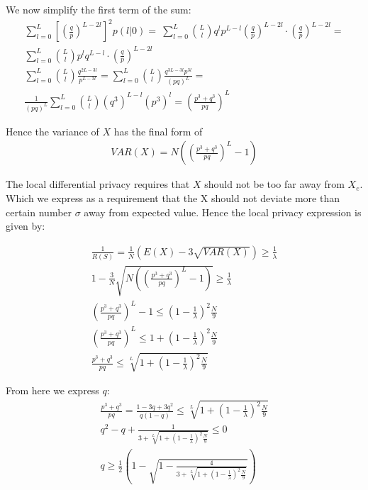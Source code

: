 \documentclass[11pt,draft]{article}
\begin{document}
We now simplify the first term of the sum:
\begin{align}
 \sum_{l=0}^{L} \left [  \left ( \frac{q}{p} \right )^ {L - 2l} \right ]^2 p(l|0)  = \
 \sum_{l=0}^{L} \binom{L}{l} q^lp^{L-l} \left ( \frac{q}{p} \right )^ {L - 2l} \cdot  \left ( \frac{q}{p} \right )^ {L - 2l} = \\
 \sum_{l=0}^{L} \binom{L}{l} p^lq^{L-l} \cdot  \left ( \frac{q}{p} \right )^ {L - 2l}  \\
 \sum_{l=0}^{L}  \binom{L}{l}   \frac{q^{2L-3l}}{p^{L-3l}} = \sum_{l=0}^{L}  \binom{L}{l}   \frac{q^{3L-3l} p^{3l}}{(pq)^{L}} = \\
 \frac{1}{(pq)^{L}} \sum_{l=0}^{L}  \binom{L}{l}   (q^3)^{L-l} (p^3)^{l} = \left ( \frac{p^3 + q^3}{pq} \right )^L
\end{align}

Hence the variance of $X$ has the final form of
\begin{align}
VAR(X) = N   \left (  \left ( \frac{p^3 + q^3}{pq} \right )^L - 1 \right )
\end{align}

The local differential privacy requires that $X$ should not be too far away from $X_e$.  Which we express as a requirement that the X should not deviate more than certain number $\sigma$ away from expected value.  Hence the local privacy expression is given by:

\begin{align}
\frac{1}{R(S)} =   \frac{1}{N}   (E(X) - 3\sqrt{VAR(X)}) \ge \frac{1}{\lambda}  \\
1 - \frac{3}{N} \sqrt{N   \left (  \left ( \frac{p^3 + q^3}{pq} \right )^L - 1 \right )}  \ge \frac{1}{\lambda}  \\
\left ( \frac{p^3 + q^3}{pq} \right )^L - 1 \le (1 -  \frac{1}{\lambda})^2 \frac{N}{9} \\
\left ( \frac{p^3 + q^3}{pq} \right )^L  \le 1 + (1 -  \frac{1}{\lambda})^2 \frac{N}{9} \\
 \frac{p^3 + q^3}{pq} \le \sqrt[L]{1 + (1 -  \frac{1}{\lambda})^2 \frac{N}{9}} 
\end{align}

From here we express $q$:
\begin{align}
 \frac{p^3 + q^3}{pq}  = \frac{1 - 3q +3q^2}{q(1-q)} \le \sqrt[L]{1 + (1 -  \frac{1}{\lambda})^2 \frac{N}{9}} \\
 q^2 - q + \frac{1}{3+\sqrt[L]{1 + (1 -  \frac{1}{\lambda})^2 \frac{N}{9}} } \le 0 \\
 q  \ge \frac{1}{2} \left ( 1 - \sqrt{1- \frac{4}{ 3+\sqrt[L]{1 + (1 -  \frac{1}{\lambda})^2 \frac{N}{9}} }} \right )
\end{align}
\end{document}
